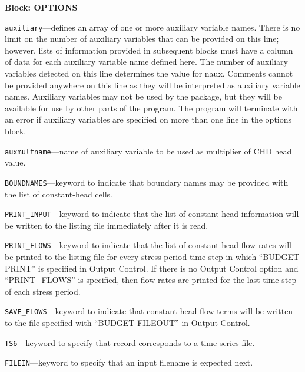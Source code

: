 
\item \textbf{Block: OPTIONS}

\begin{description}
\item \texttt{auxiliary}---defines an array of one or more auxiliary variable names.  There is no limit on the number of auxiliary variables that can be provided on this line; however, lists of information provided in subsequent blocks must have a column of data for each auxiliary variable name defined here.   The number of auxiliary variables detected on this line determines the value for naux.  Comments cannot be provided anywhere on this line as they will be interpreted as auxiliary variable names.  Auxiliary variables may not be used by the package, but they will be available for use by other parts of the program.  The program will terminate with an error if auxiliary variables are specified on more than one line in the options block.

\item \texttt{auxmultname}---name of auxiliary variable to be used as multiplier of CHD head value.

\item \texttt{BOUNDNAMES}---keyword to indicate that boundary names may be provided with the list of constant-head cells.

\item \texttt{PRINT\_INPUT}---keyword to indicate that the list of constant-head information will be written to the listing file immediately after it is read.

\item \texttt{PRINT\_FLOWS}---keyword to indicate that the list of constant-head flow rates will be printed to the listing file for every stress period time step in which ``BUDGET PRINT'' is specified in Output Control.  If there is no Output Control option and ``PRINT\_FLOWS'' is specified, then flow rates are printed for the last time step of each stress period.

\item \texttt{SAVE\_FLOWS}---keyword to indicate that constant-head flow terms will be written to the file specified with ``BUDGET FILEOUT'' in Output Control.

\item \texttt{TS6}---keyword to specify that record corresponds to a time-series file.

\item \texttt{FILEIN}---keyword to specify that an input filename is expected next.


\end{description}
